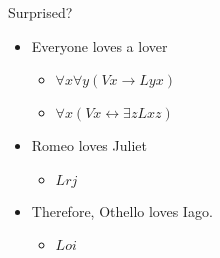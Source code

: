 \documentclass[
  ignorenonframetext,
]{beamer}
\begin{document}
\begin{frame}[fragile]{Surprised?}
\protect\hypertarget{surprised}{}

\begin{itemize}[<+->]
\item
  Everyone loves a lover
\begin{itemize}
\item ${\forall}x {\forall}y (Vx \rightarrow Lyx)$
\item ${\forall}x (Vx \leftrightarrow {\exists}z Lxz)$
\end{itemize}
\item
  Romeo loves Juliet
\begin{itemize}
\item $Lrj$
\end{itemize}
\item
  Therefore, Othello loves Iago.
\begin{itemize}
\item $Loi$
\end{itemize}
\end{itemize}

\end{frame}
\end{document}
